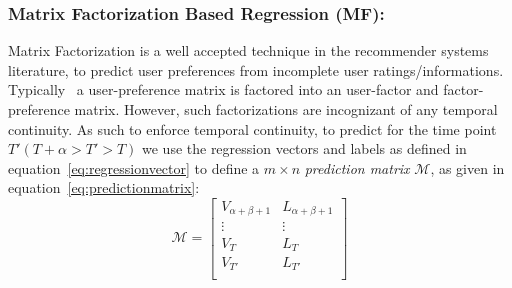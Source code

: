 \subsubsection{\label{sec:model:matrixfactor} Matrix Factorization Based Regression (MF):}
Matrix Factorization is a well accepted technique in
the recommender systems literature, to predict user 
preferences from incomplete user ratings/informations. Typically~\cite{canny2002factor}
a user-preference matrix is factored into an user-factor and
factor-preference matrix. However, such factorizations are incognizant of any 
temporal continuity. As such to enforce temporal continuity, to predict for the time point 
$T' (T +\alpha > T' > T)$ we use the regression vectors 
and labels as defined in equation~\ref{eq:regressionvector} to define a $m \times n$ {\it prediction
matrix} $\mathcal{M}$, as given in equation~\ref{eq:predictionmatrix}:
\vspace{-1em}
\begin{equation}
  \label{eq:predictionmatrix}
\mathcal{M} = \left[\begin{array}{ll}
              V_{\alpha + \beta + 1} & L_{\alpha+\beta + 1} \\
                              \vdots & \vdots \\
                               V_{T} & L_T \\
                               V_{T'} & L_{T'} \\ 
    \end{array}
  \right]
\end{equation}

